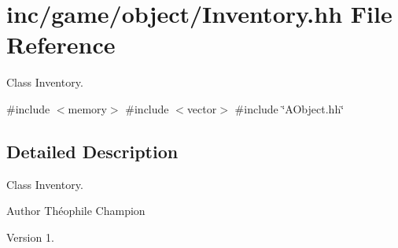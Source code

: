 \hypertarget{Inventory_8hh}{}\section{inc/game/object/\+Inventory.hh File Reference}
\label{Inventory_8hh}


Class Inventory.  


{\ttfamily \#include $<$memory$>$}\newline
{\ttfamily \#include $<$vector$>$}\newline
{\ttfamily \#include \char`\"{}A\+Object.\+hh\char`\"{}}\newline


\subsection{Detailed Description}
Class Inventory. 

\begin{DoxyAuthor}{Author}
Théophile Champion 
\end{DoxyAuthor}
\begin{DoxyVersion}{Version}
1. 
\end{DoxyVersion}

